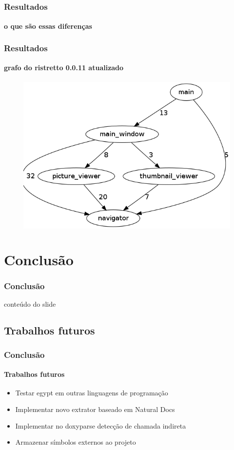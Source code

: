 \documentclass{beamer}
\begin{document}
\begin{frame}
\frametitle{Resultados}
\framesubtitle{o que são essas diferenças}
\end{frame}

\begin{frame}
\frametitle{Resultados}
\framesubtitle{grafo do ristretto 0.0.11 atualizado}
 \begin{figure}
 \center
 \includegraphics[scale=0.3]{imagens/ristretto-0_0_11-doxyparse-2}
 \label{fig:ristretto-0.0.11-doxyparse-2}
 \end{figure}
\end{frame}

\section{Conclusão}

\begin{frame}
\frametitle{Conclusão}
 conteúdo do slide
\end{frame}

\subsection{Trabalhos futuros}

\begin{frame}
\frametitle{Conclusão}
\framesubtitle{Trabalhos futuros}
 \begin{itemize}
 \item<1- >Testar egypt em outras linguagens de programação
 \item<1- >Implementar novo extrator baseado em Natural Docs
 \item<1- >Implementar no doxyparse detecção de chamada indireta
 \item<1- >Armazenar símbolos externos ao projeto
 \end{itemize}
\end{frame}
\end{document}
